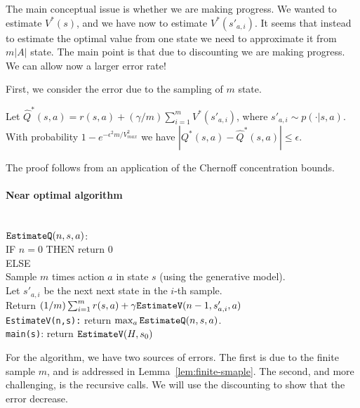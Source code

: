 The main conceptual issue is whether we are making progress. We
wanted to estimate $V^*(s)$, and we have now to estimate
$V^*(s'_{a,i})$. It seems that instead to estimate the optimal value
from one state we need to approximate it from $m|A|$ state. The main
point is that due to discounting we are making progress. We can
allow now a larger error rate!

First, we consider the error due to the sampling of $m$ state.
\begin{lemma}
\label{lem:finite-smaple} Let $\hat{Q}^*(s,a)=r(s,a)+(\gamma
/m)\sum_{i=1}^m V^*(s'_{a,i})$, where $s'_{a,i}\sim p(\cdot|s,a)$.
With probability $1-e^{-\epsilon^2 m/V^2_{max}}$ we have
$|Q^*(s,a)-\hat{Q}^*(s,a)|\leq \epsilon$.
\end{lemma}
The proof follows from an application of the Chernoff concentration
bounds.

\paragraph{Near optimal algorithm}\ \\

\bigskip
\noindent
$\mbox{\tt EstimateQ}(n,s,a)$:\\
IF $n=0$ THEN return $0$\\
ELSE\\
Sample $m$ times action $a$ in state $s$ (using the generative
model).\\
Let $s'_{a,i}$ be the next next state in the $i$-th sample.\\
Return $(1/m)\sum_{i=1}^m r(s,a)+ \gamma \mbox{\tt EstimateV}(n-1,s'_{a,i},a)$\\

\medskip
\noindent
{\tt EstimateV(n,s):} return $\max_a \mbox{\tt EstimateQ}(n,s,a)$.\\

\medskip
\noindent
{\tt main(s)}: return $\mbox{\tt EstimateV}(H,s_0)$\\
\bigskip

For the algorithm, we have two sources of errors. The first is due
to the finite sample $m$, and is addressed in
Lemma~\ref{lem:finite-smaple}. The second, and more challenging, is
the recursive calls. We will use the discounting to show that the
error decrease.

